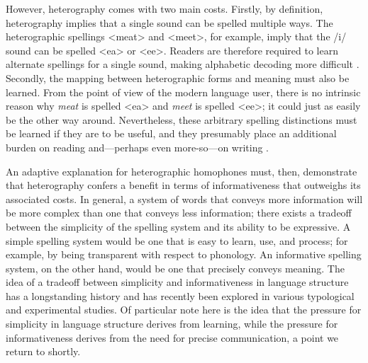 \documentclass[doc,biblatex]{apa7}
\begin{document}
However, heterography comes with two main costs. Firstly, by definition, heterography implies that a single sound can be spelled multiple ways. The heterographic spellings <meat> and <meet>, for example, imply that the /i/ sound can be spelled <ea> or <ee>. Readers are therefore required to learn alternate spellings for a single sound, making alphabetic decoding more difficult \parencite{Seymour:2003, Spencer:2003, Taylor:2011, Zhao:2018}. Secondly, the mapping between heterographic forms and meaning must also be learned. From the point of view of the modern language user, there is no intrinsic reason why \textit{meat} is spelled <ea> and \textit{meet} is spelled <ee>; it could just as easily be the other way around. Nevertheless, these arbitrary spelling distinctions must be learned if they are to be useful, and they presumably place an additional burden on reading and---perhaps even more-so---on writing \parencite{Shankweiler:1992}.

An adaptive explanation for heterographic homophones must, then, demonstrate that heterography confers a benefit in terms of informativeness that outweighs its associated costs. In general, a system of words that conveys more information will be more complex than one that conveys less information; there exists a tradeoff between the simplicity of the spelling system and its ability to be expressive. A simple spelling system would be one that is easy to learn, use, and process; for example, by being transparent with respect to phonology. An informative spelling system, on the other hand, would be one that precisely conveys meaning. The idea of a tradeoff between simplicity and informativeness in language structure has a longstanding history \parencite{Gabelentz:1891, Zipf:1949, Martinet:1952, Rosch:1978} and has recently been explored in various typological \parencite[e.g.,][]{Kemp:2018} and experimental \parencite[e.g.,][]{Kirby:2015} studies. Of particular note here is the idea that the pressure for simplicity in language structure derives from learning, while the pressure for informativeness derives from the need for precise communication, a point we return to shortly.
\end{document}
